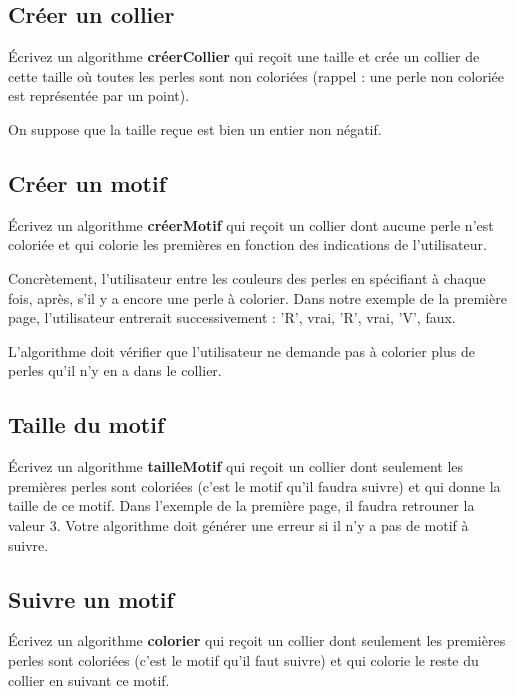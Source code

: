		\subsection*{Créer un collier}
		
			Écrivez un algorithme \textbf{créerCollier}
			qui reçoit une taille et crée un collier de cette taille
			où toutes les perles sont non coloriées
			(rappel : une perle non coloriée est représentée par un point).
			
			On suppose que la taille reçue est bien un entier non négatif.
	
		\subsection*{Créer un motif}
		
			Écrivez un algorithme \textbf{créerMotif}
			qui reçoit un collier dont aucune perle n'est coloriée
			et qui colorie les premières en fonction des indications
			de l'utilisateur.
			
			Concrètement,
			l'utilisateur entre les couleurs des perles
			en spécifiant à chaque fois, après,
			s'il y a encore une perle à colorier.
			Dans notre exemple de la première page,
			l'utilisateur entrerait successivement :
			'R', vrai, 'R', vrai, 'V', faux. 
			
			L'algorithme doit vérifier que l'utilisateur
			ne demande pas à colorier plus de perles
			qu'il n'y en a dans le collier.
	
		\subsection*{Taille du motif}
	
			Écrivez un algorithme \textbf{tailleMotif}
			qui reçoit un collier dont seulement les premières perles sont coloriées
			(c'est le motif qu'il faudra suivre)
			et qui donne la taille de ce motif.
			Dans l'exemple de la première page, il faudra retrouner la valeur 3.
			Votre algorithme doit générer une erreur si il n'y a pas de motif à suivre.
	
		\subsection*{Suivre un motif}
		
			Écrivez un algorithme \textbf{colorier}
			qui reçoit un collier dont seulement les premières perles sont coloriées
			(c'est le motif qu'il faut suivre)
			et qui colorie le reste du collier en suivant ce motif.
			

